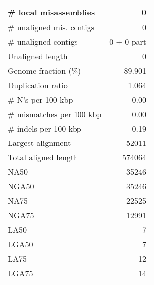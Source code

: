 \documentclass[12pt,a4paper]{article}
\begin{document}
\begin{table}[ht]
\begin{center}
\begin{tabular}{|l*{1}{|r}|}
\# local misassemblies & 0 \\ \hline
\# unaligned mis. contigs & 0 \\ \hline
\# unaligned contigs & 0 + 0 part \\ \hline
Unaligned length & 0 \\ \hline
Genome fraction (\%) & 89.901 \\ \hline
Duplication ratio & 1.064 \\ \hline
\# N's per 100 kbp & 0.00 \\ \hline
\# mismatches per 100 kbp & 0.00 \\ \hline
\# indels per 100 kbp & 0.19 \\ \hline
Largest alignment & 52011 \\ \hline
Total aligned length & 574064 \\ \hline
NA50 & 35246 \\ \hline
NGA50 & 35246 \\ \hline
NA75 & 22525 \\ \hline
NGA75 & 12991 \\ \hline
LA50 & 7 \\ \hline
LGA50 & 7 \\ \hline
LA75 & 12 \\ \hline
LGA75 & 14 \\ \hline
\end{tabular}
\end{center}
\end{table}
\end{document}

